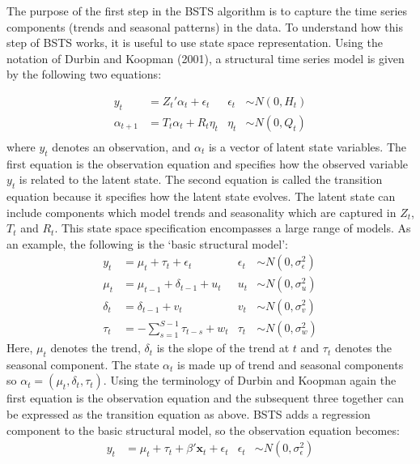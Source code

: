 The purpose of the first step in the BSTS algorithm is to capture the time series components (trends and seasonal patterns) in the data. To understand how this step of BSTS works, it is useful to use state space representation. Using the notation of Durbin and Koopman (2001), a structural time series model is given by the following two equations:

\begin{align*}
y_{t} &= Z_{t}'\alpha_{t}+\epsilon_{t} & \epsilon_{t} &\sim N(0, H_{t}) \\
\alpha_{t+1}&= T_{t}\alpha_{t} +R_{t}\eta_{t} & \eta_{t} &\sim N(0, Q_{t})\\
\end{align*}
where $y_{t}$ denotes an observation, and $\alpha_{t}$ is a vector of latent state variables. The first equation is the observation equation and specifies how the observed variable $y_{t}$ is related to the latent state. The second equation is called the transition equation because it specifies how the latent state evolves. The latent state can include components which model trends and seasonality which are captured in $Z_{t}$, $T_{t}$ and $R_{t}$. This state space specification encompasses a large range of models. As an example, the following is the `basic structural model': 
\begin{align*}
y_{t} &= \mu_{t} + \tau_{t} + \epsilon_{t}&\epsilon_{t} &\sim N(0, \sigma_{\epsilon}^{2}) \\
\mu_{t} &= \mu_{t-1} + \delta_{t-1} + u_{t}&u_{t} &\sim N(0, \sigma_{u}^{2})\\
\delta_{t} &= \delta_{t-1} + v_{t}  &v_{t} &\sim N(0, \sigma_{v}^{2})\\
\tau_{t} &= - \sum_{s=1}^{S-1}\tau_{t-s}+w_{t}&	\tau_{t} &\sim N(0, \sigma_{w}^{2})
\end{align*}
Here, $\mu_{t}$ denotes the trend, $\delta_{t}$ is the slope of the trend at $t$ and $\tau_{t}$ denotes the seasonal component. The state $\alpha_{t}$ is made up of trend and seasonal components so $\alpha_{t} =  (\mu_{t}, \delta_{t}, \tau_{t})$. Using the terminology of Durbin and Koopman again the first equation is the observation equation and the subsequent three together can be expressed as the transition equation as above.
BSTS adds a regression component to the basic structural model, so the observation equation  becomes:
\begin{align*}
y_{t} &= \mu_{t} + \tau_{t} + \beta'\textbf{x}_{t} + \epsilon_{t}& \epsilon_{t} &\sim N(0, \sigma_{\epsilon}^{2})
\end{align*}

